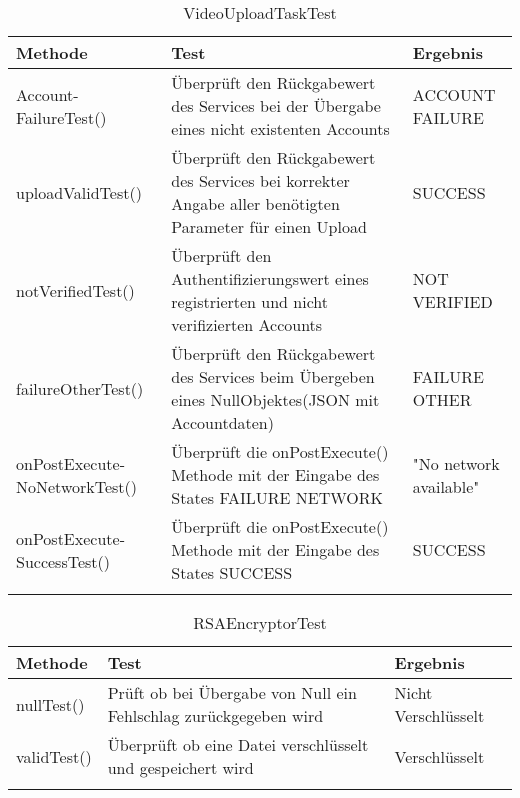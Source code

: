 \begin{longtable}{p{} | p{} | p{}}
\hline
  \textbf{Methode} & \textbf{Test} & \textbf{Ergebnis}\\
  \hline
  Account- \newline FailureTest() & Überprüft den Rückgabewert des Services bei der Übergabe eines nicht existenten Accounts & ACCOUNT FAILURE \\
  \hline
  uploadValidTest() & Überprüft den Rückgabewert des Services bei korrekter Angabe aller benötigten Parameter für einen Upload  & SUCCESS \\
  \hline
  notVerifiedTest() & Überprüft den Authentifizierungswert eines registrierten und nicht verifizierten Accounts & NOT VERIFIED \\
  \hline
  failureOtherTest() & Überprüft den Rückgabewert des Services beim Übergeben eines NullObjektes(JSON mit Accountdaten) & FAILURE OTHER \\
  \hline
   onPostExecute- \newline NoNetworkTest() & Überprüft die onPostExecute() Methode mit der Eingabe des States FAILURE NETWORK & "No network available" \\
  \hline
  onPostExecute- \newline SuccessTest() & Überprüft die onPostExecute() Methode mit der Eingabe des States SUCCESS & SUCCESS \\
  \hline
  \caption{VideoUploadTaskTest}
 \end{longtable}
 
\begin{longtable}{p{} | p{} | p{}}
\hline
  \textbf{Methode} & \textbf{Test} & \textbf{Ergebnis}\\
  \hline
  nullTest() & Prüft ob bei Übergabe von Null ein Fehlschlag zurückgegeben wird & Nicht Verschlüsselt \\
  \hline
  validTest() & Überprüft ob eine Datei verschlüsselt und gespeichert wird & Verschlüsselt \\
  \hline
  \caption{RSAEncryptorTest}
 \end{longtable}
 
